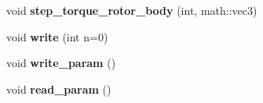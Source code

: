 \begin{DoxyCompactItemize}
\item 
\hypertarget{classAttitude_a303e24774c3086915d85803be88a5e27}{
void {\bfseries step\_\-torque\_\-rotor\_\-body} (int, math::vec3)}
\label{classAttitude_a303e24774c3086915d85803be88a5e27}

\item 
\hypertarget{classAttitude_a8e46df6befc26497fe52c7a727da2154}{
void {\bfseries write} (int n=0)}
\label{classAttitude_a8e46df6befc26497fe52c7a727da2154}

\item 
\hypertarget{classAttitude_a82ea007a5d6b22c5016308b982816459}{
void {\bfseries write\_\-param} ()}
\label{classAttitude_a82ea007a5d6b22c5016308b982816459}

\item 
\hypertarget{classAttitude_a628672fe0bc80ab2451362a519bfc81f}{
void {\bfseries read\_\-param} ()}
\label{classAttitude_a628672fe0bc80ab2451362a519bfc81f}

\end{DoxyCompactItemize}
